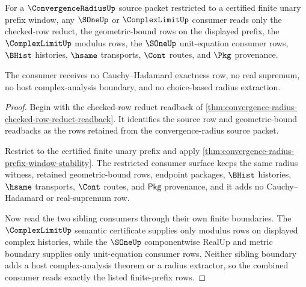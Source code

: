 \begin{theorem}
\label{thm:convrad-s1-complexlimit-consumer-boundary}
For a $\ConvergenceRadiusUp$ source packet restricted to a certified finite unary prefix window, any $\SOneUp$ or $\ComplexLimitUp$ consumer reads only the checked-row reduct, the geometric-bound rows on the displayed prefix, the $\ComplexLimitUp$ modulus rows, the $\SOneUp$ unit-equation consumer rows, $\BHist$ histories, $\hsame$ transports, $\Cont$ routes, and $\Pkg$ provenance.

The consumer receives no Cauchy--Hadamard exactness row, no real supremum, no host complex-analysis boundary, and no choice-based radius extraction.
\end{theorem}
\begin{proof}
Begin with the checked-row reduct readback of \autoref{thm:convergence-radius-checked-row-reduct-readback}. It identifies the source row and geometric-bound readbacks as the rows retained from the convergence-radius source packet.

Restrict to the certified finite unary prefix and apply \autoref{thm:convergence-radius-prefix-window-stability}. The restricted consumer surface keeps the same radius witness, retained geometric-bound rows, endpoint packages, $\BHist$ histories, $\hsame$ transports, $\Cont$ routes, and $\mathsf{Pkg}$ provenance, and it adds no Cauchy--Hadamard or real-supremum row.

Now read the two sibling consumers through their own finite boundaries. The $\ComplexLimitUp$ semantic certificate supplies only modulus rows on displayed complex histories, while the $\SOneUp$ componentwise RealUp and metric boundary supplies only unit-equation consumer rows. Neither sibling boundary adds a host complex-analysis theorem or a radius extractor, so the combined consumer reads exactly the listed finite-prefix rows.
\end{proof}

